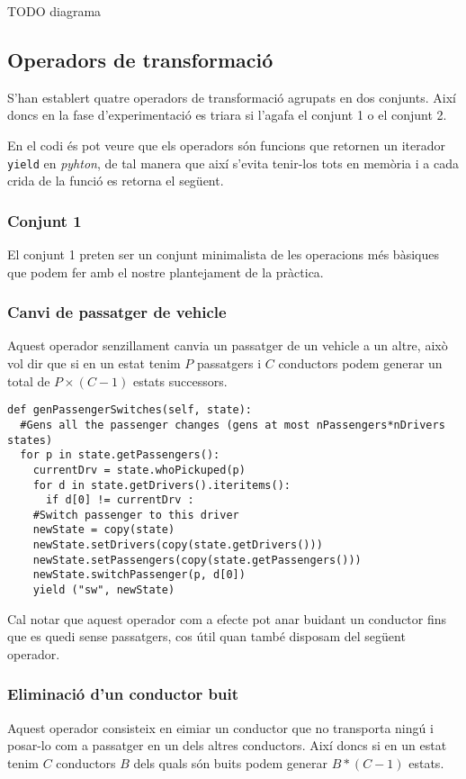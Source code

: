 TODO diagrama

\subsection{Operadors de transformació}
S'han establert quatre operadors de transformació agrupats en dos conjunts. Així doncs en la fase d'experimentació
es triara si l'agafa el conjunt 1 o el conjunt 2.

En el codi és pot veure que els operadors són funcions que retornen un iterador \texttt{yield} en \emph{pyhton},
de tal manera que així s'evita tenir-los tots en memòria i a cada crida de la funció es retorna el següent.

\subsubsection{Conjunt 1}
El conjunt 1 preten ser un conjunt minimalista de les operacions més bàsiques que podem fer amb el nostre plantejament
de la pràctica.
\subsubsection{Canvi de passatger de vehicle}
Aquest operador senzillament canvia un passatger de un vehicle a un altre, això vol dir que si en un estat
tenim $P$ passatgers i $C$ conductors podem generar un total de $P\times(C-1)$ estats successors.

\begin{verbatim}
def genPassengerSwitches(self, state):
  #Gens all the passenger changes (gens at most nPassengers*nDrivers states)
  for p in state.getPassengers():
    currentDrv = state.whoPickuped(p)  
    for d in state.getDrivers().iteritems():
      if d[0] != currentDrv :
	#Switch passenger to this driver
	newState = copy(state)
	newState.setDrivers(copy(state.getDrivers()))
	newState.setPassengers(copy(state.getPassengers()))
	newState.switchPassenger(p, d[0])
	yield ("sw", newState)
\end{verbatim}

Cal notar que aquest operador com a efecte pot anar buidant un conductor fins que es quedi sense passatgers,
cos útil quan també disposam del següent operador.

\subsubsection{Eliminació d'un conductor buit}
Aquest operador consisteix en e\lgem imiar un conductor que no transporta ningú i posar-lo com a passatger
en un dels altres conductors. Així doncs si en un estat tenim $C$ conductors $B$ dels quals són buits
podem generar $B*(C-1)$ estats.

